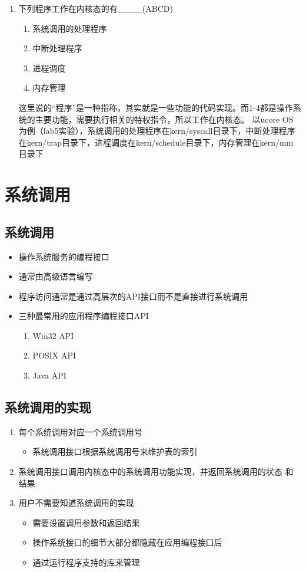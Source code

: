 \begin{enumerate}
\item 下列程序工作在内核态的有\_\_\_\_(ABCD)
\begin{enumerate}[A]
	\item 系统调用的处理程序
	\item 中断处理程序
	\item 进程调度
	\item 内存管理
\end{enumerate}
这里说的“程序”是一种指称，其实就是一些功能的代码实现。而1-4都是操作系统的主要功能，需要执行相关的特权指令，所以工作在内核态。 以ucore OS为例（lab5实验），系统调用的处理程序在kern/syscall目录下，中断处理程序在kern/trap目录下，进程调度在kern/schedule目录下，内存管理在kern/mm目录下
\end{enumerate}

\section{系统调用}
\subsection{系统调用}
\begin{itemize}
	\item 操作系统服务的编程接口
	\item 通常由高级语言编写
	\item 程序访问通常是通过高层次的API接口而不是直接进行系统调用
	\item 三种最常用的应用程序编程接口API
	\begin{enumerate}
		\item Win32 API
		\item POSIX API
		\item Java API
	\end{enumerate}
\end{itemize}
\subsection{系统调用的实现}
\begin{enumerate}
	\item 每个系统调用对应一个系统调用号
	\begin{itemize}
		\item 系统调用接口根据系统调用号来维护表的索引
	\end{itemize}
\item 系统调用接口调用内核态中的系统调用功能实现，并返回系统调用的状态
和结果
\item 用户不需要知道系统调用的实现
\begin{itemize}
	\item 需要设置调用参数和返回结果
	\item 操作系统接口的细节大部分都隐藏在应用编程接口后
	\item 通过运行程序支持的库来管理
\end{itemize}
\end{enumerate}
